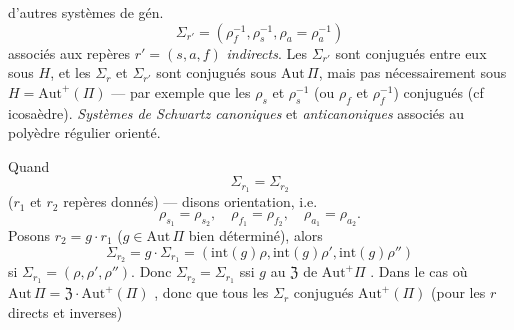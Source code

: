 \documentclass[11pt,a4paper]{article}
\begin{document}
d'autres systèmes de gén.
\[
\Sigma_{r'} = (\rho_f^{-1}, \rho_s^{-1}, \rho_a = \rho_a^{-1})
\]
associés aux repères $r' = (s, a, f)$ \emph{indirects}. Les $\Sigma_{r'}$ sont
conjugués entre eux sous $H$, et les $\Sigma_r$ et $\Sigma_{r'}$ sont
conjugués sous $\mathrm{Aut}\,\Pi$, mais pas nécessairement sous
$H = \mathrm{Aut}^{+}(\Pi)$ --- par exemple 
que les $\rho_s$ et $\rho_s^{-1}$ (ou $\rho_f$ et $\rho_f^{-1}$)  conjugués (cf icosaèdre). \emph{Systèmes de Schwartz canoniques} et
\emph{anticanoniques} associés au polyèdre régulier orienté.

Quand 
\[
\Sigma_{r_1} = \Sigma_{r_2}
\]
($r_1$ et $r_2$  repères donnés) --- disons 
orientation, i.e.
\[
\rho_{s_1} = \rho_{s_2},\quad \rho_{f_1} = \rho_{f_2},\quad
\rho_{a_1} = \rho_{a_2}.
\]
 Posons $r_2 = g \cdot r_1$ ($g \in \mathrm{Aut}\,\Pi$ bien
déterminé), alors
\[
\Sigma_{r_2} = g \cdot \Sigma_{r_1}
= (\mathrm{int}(g)\rho, \mathrm{int}(g)\rho', \mathrm{int}(g)\rho'')
\]
si $\Sigma_{r_1} = (\rho, \rho', \rho'')$. Donc $\Sigma_{r_2} = \Sigma_{r_1}$
ssi $g$  au   $\mathfrak{Z}$ de
$\mathrm{Aut}^{+}\Pi$ . Dans le cas où
$\mathrm{Aut}\,\Pi = \mathfrak{Z} \cdot \mathrm{Aut}^{+}(\Pi)$ ,  donc que \struck{\ill{}} tous les
$\Sigma_r$ conjugués  $\mathrm{Aut}^{+}(\Pi)$ (pour les $r$
directs et inverses)
\end{document}

